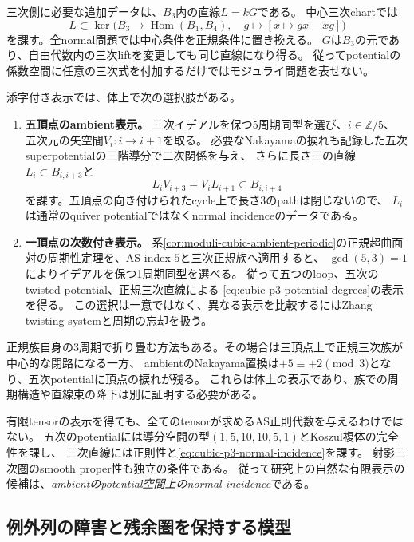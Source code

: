 三次側に必要な追加データは、$B_3$内の直線$L=kG$である。
中心三次chartでは
\[
 L\subset\ker\bigl(B_3\longrightarrow
        \operatorname{Hom}(B_1,B_4),\quad g\longmapsto[x\mapsto gx-xg]\bigr)
\]
を課す。全normal問題では中心条件を正規条件に置き換える。
$G$は$B_3$の元であり、自由代数内の三次liftを変更しても同じ直線になり得る。
従ってpotentialの係数空間に任意の三次式を付加するだけではモジュライ問題を表せない。

添字付き表示では、体上で次の選択肢がある。
\begin{enumerate}
\item \textbf{五頂点のambient表示。}
三次イデアルを保つ5周期同型を選び、$i\in\mathbb Z/5$、
五次元の矢空間$V_i:i\to i+1$を取る。
必要なNakayamaの捩れも記録した五次superpotentialの三階導分で二次関係を与え、
さらに長さ三の直線$L_i\subset B_{i,i+3}$と
\begin{equation}\label{eq:cubic-p3-normal-incidence}
 L_iV_{i+3}=V_iL_{i+1}\subset B_{i,i+4}
\end{equation}
を課す。五頂点の向き付けられたcycle上で長さ3のpathは閉じないので、
$L_i$は通常のquiver potentialではなくnormal incidenceのデータである。
\item \textbf{一頂点の次数付き表示。}
系\ref{cor:moduli-cubic-ambient-periodic}の正規超曲面対の周期性定理を、AS index $5$と三次正規族へ適用すると、
$\gcd(5,3)=1$によりイデアルを保つ1周期同型を選べる。
従って五つのloop、五次のtwisted potential、正規三次直線による
\eqref{eq:cubic-p3-potential-degrees}の表示を得る。
この選択は一意ではなく、異なる表示を比較するにはZhang twisting systemと周期の忘却を扱う。
\end{enumerate}
正規族自身の3周期で折り畳む方法もある。その場合は三頂点上で正規三次族が中心的な閉路になる一方、
ambientのNakayama置換は$+5\equiv+2\pmod3$となり、五次potentialに頂点の捩れが残る。
これらは体上の表示であり、族での周期構造や直線束の降下は別に証明する必要がある。

有限tensorの表示を得ても、全てのtensorが求めるAS正則代数を与えるわけではない。
五次のpotentialには導分空間の型$(1,5,10,10,5,1)$とKoszul複体の完全性を課し、
三次直線には正則性と\eqref{eq:cubic-p3-normal-incidence}を課す。
射影三次圏のsmooth proper性も独立の条件である。
従って研究上の自然な有限表示の候補は、\emph{ambientのpotential空間上のnormal incidence}である。

\subsection{例外列の障害と残余圏を保持する模型}

